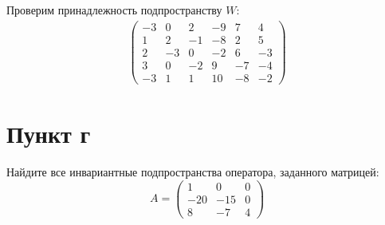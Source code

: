 \documentclass[12pt]{article}
\begin{document}
    Проверим принадлежность подпространству $W$:
    \begin{gather*}
        \begin{pmatrix}
            -3 & 0 & 2 & -9 & 7 & 4 \\
            1 & 2 & -1 & -8 & 2 & 5 \\
            2 & -3 & 0 & -2 & 6 & -3 \\
            3 & 0 & -2 & 9 & -7 & -4 \\
            -3 & 1 & 1 & 10 & -8 & -2
        \end{pmatrix}
    \end{gather*}
    \section*{Пункт г}
    Найдите все инвариантные подпространства оператора, заданного матрицей:
    \[
        A
        = \begin{pmatrix}
              1 & 0 & 0 \\
              -20 & -15 & 0 \\
              8 & -7 & 4
        \end{pmatrix}
    \]
\end{document}
